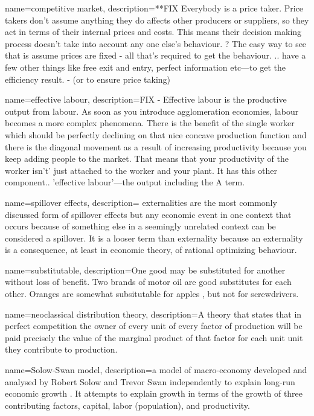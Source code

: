 {
name=competitive market,
description={**FIX Everybody is a price taker. Price takers don't assume anything they do affects other producers or suppliers, so they act in terms of their internal prices and costs. 
This means their decision making process doesn't take into account any one else's behaviour.
? The easy way to see that is assume prices are fixed - all that's required to get the behaviour. ..  have a few other things like free exit and entry, perfect information etc---to get the efficiency result. - (or to ensure price taking)}
}

{
name=effective labour,
description={FIX - Effective labour is the productive \gls{output} from labour. As soon as you introduce agglomeration economies, labour becomes a more complex phenomena. There is the benefit of the single worker which should be perfectly declining on that nice concave production function and there is the diagonal movement as a result of increasing productivity because you keep adding people to the market. That means that your productivity of the worker isn't' just attached to the worker and your plant. It has this other component.. 'effective labour'---the output including the A term.}
}

{
name=spillover effects,
description={ \Gls{externalities} are the most commonly discussed form of spillover effects but any economic event in one context that occurs because of something else in a seemingly unrelated context can be considered a spillover. It is a looser term than externality because an externality is a consequence, at least in economic theory, of rational optimizing behaviour.}
}

{
name=substitutable,
description={One good may be substituted for another without loss of benefit. Two brands of motor oil are good substitutes for each other. Oranges are somewhat subsitutable for apples , but not for screwdrivers.}
}

{
name=neoclassical distribution theory,
description={A theory that states that in perfect competition the owner of every unit of every  \gls{factor of production} will be paid precisely the  value of the \gls{marginal product} of that factor for each unit unit they contribute to production.}
}

{
name=Solow-Swan model,
description={a  model of macro-economy developed and analysed by Robert Solow and Trevor Swan independently to explain long-run economic growth \cite{dimandTrevorSwanNeoclassical2009}. It attempts to explain  growth in terms of the growth of three contributing factors, capital, labor (population),  and  productivity.}
}



